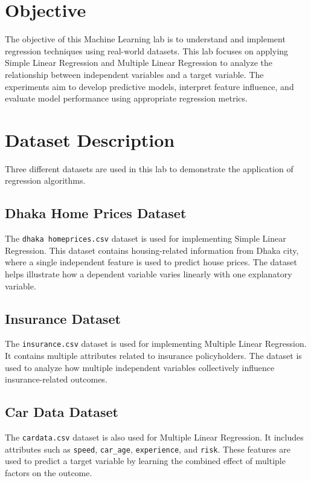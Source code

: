 \documentclass[11pt]{article}
\begin{document}
    
\tableofcontents
\thispagestyle{empty}
\clearpage
{}
    
	
\section{Objective}

The objective of this Machine Learning lab is to understand and implement regression techniques using real-world datasets. This lab focuses on applying Simple Linear Regression and Multiple Linear Regression to analyze the relationship between independent variables and a target variable. The experiments aim to develop predictive models, interpret feature influence, and evaluate model performance using appropriate regression metrics.

\section{Dataset Description}

Three different datasets are used in this lab to demonstrate the application of regression algorithms.

\subsection*{Dhaka Home Prices Dataset}
The \texttt{dhaka homeprices.csv} dataset is used for implementing Simple Linear Regression. This dataset contains housing-related information from Dhaka city, where a single independent feature is used to predict house prices. The dataset helps illustrate how a dependent variable varies linearly with one explanatory variable.

\subsection*{Insurance Dataset}
The \texttt{insurance.csv} dataset is used for implementing Multiple Linear Regression. It contains multiple attributes related to insurance policyholders. The dataset is used to analyze how multiple independent variables collectively influence insurance-related outcomes.

\subsection*{Car Data Dataset}
The \texttt{cardata.csv} dataset is also used for Multiple Linear Regression. It includes attributes such as \texttt{speed}, \texttt{car\_age}, \texttt{experience}, and \texttt{risk}. These features are used to predict a target variable by learning the combined effect of multiple factors on the outcome.
   
\end{document}
